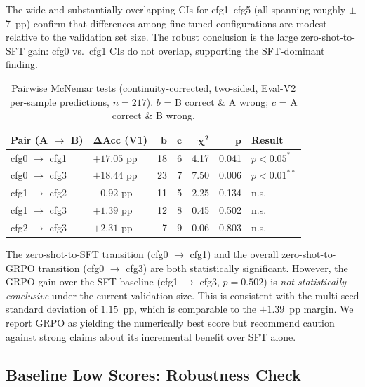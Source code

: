 \documentclass{ieeeaccess}
\begin{document}
The wide and substantially overlapping CIs for cfg1--cfg5 (all spanning
roughly $\pm$7~pp) confirm that differences among fine-tuned configurations
are modest relative to the validation set size.
The robust conclusion is the large zero-shot-to-SFT gain: cfg0 vs.\ cfg1
CIs do not overlap, supporting the SFT-dominant finding.

\begin{table}[t]
  \centering
  \caption{Pairwise McNemar tests (continuity-corrected, two-sided,
           Eval-V2 per-sample predictions, $n=217$).
           $b$ = B correct \& A wrong; $c$ = A correct \& B wrong.}
  \label{tab:mcnemar}
  \begin{tabular}{llrrrrl}
    \toprule
    \textbf{Pair (A $\to$ B)} & $\boldsymbol{\Delta}$\textbf{Acc (V1)} & $\boldsymbol{b}$ & $\boldsymbol{c}$ & $\boldsymbol{\chi^2}$ & $\boldsymbol{p}$ & \textbf{Result} \\
    \midrule
    cfg0 $\to$ cfg1 & $+17.05$ pp & 18 & 6 & 4.17 & 0.041  & $p{<}0.05^*$ \\
    cfg0 $\to$ cfg3 & $+18.44$ pp & 23 & 7 & 7.50 & 0.006  & $p{<}0.01^{**}$ \\
    cfg1 $\to$ cfg2 & $-0.92$ pp  & 11 & 5 & 2.25 & 0.134  & n.s. \\
    cfg1 $\to$ cfg3 & $+1.39$ pp  & 12 & 8 & 0.45 & 0.502  & n.s. \\
    cfg2 $\to$ cfg3 & $+2.31$ pp  &  7 & 9 & 0.06 & 0.803  & n.s. \\
    \bottomrule
  \end{tabular}
\end{table}

The zero-shot-to-SFT transition (cfg0 $\to$ cfg1) and the overall
zero-shot-to-GRPO transition (cfg0 $\to$ cfg3) are both statistically
significant.
However, the GRPO gain over the SFT baseline (cfg1 $\to$ cfg3,
$p = 0.502$) is \emph{not statistically conclusive} under the current
validation size.
This is consistent with the multi-seed standard deviation of $1.15$~pp,
which is comparable to the $+1.39$~pp margin.
We report GRPO as yielding the numerically best score but recommend
caution against strong claims about its incremental benefit over SFT alone.

\subsection{Baseline Low Scores: Robustness Check}
\label{sec:baseline_robustness}
\end{document}
